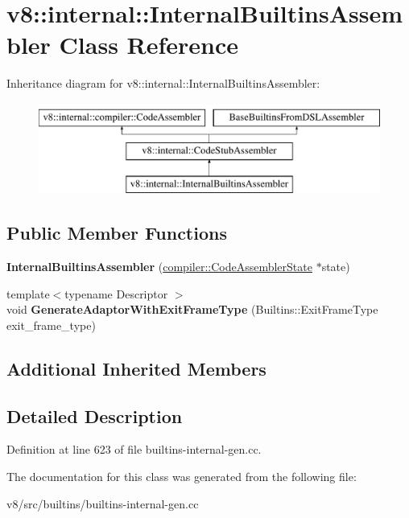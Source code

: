 \hypertarget{classv8_1_1internal_1_1InternalBuiltinsAssembler}{}\section{v8\+:\+:internal\+:\+:Internal\+Builtins\+Assembler Class Reference}
\label{classv8_1_1internal_1_1InternalBuiltinsAssembler}
Inheritance diagram for v8\+:\+:internal\+:\+:Internal\+Builtins\+Assembler\+:\begin{figure}[H]
\begin{center}
\leavevmode
\includegraphics[height=3.000000cm]{classv8_1_1internal_1_1InternalBuiltinsAssembler}
\end{center}
\end{figure}
\subsection*{Public Member Functions}
\begin{DoxyCompactItemize}
\item 
\mbox{\label{classv8_1_1internal_1_1InternalBuiltinsAssembler_a44792f3751df13c671384992a852888e}} 
{\bfseries Internal\+Builtins\+Assembler} (\mbox{\hyperlink{classv8_1_1internal_1_1compiler_1_1CodeAssemblerState}{compiler\+::\+Code\+Assembler\+State}} $\ast$state)
\item 
\mbox{\label{classv8_1_1internal_1_1InternalBuiltinsAssembler_a7cd0d3f8e7bc710cf3cdefb9d083514c}} 
{\footnotesize template$<$typename Descriptor $>$ }\\void {\bfseries Generate\+Adaptor\+With\+Exit\+Frame\+Type} (Builtins\+::\+Exit\+Frame\+Type exit\+\_\+frame\+\_\+type)
\end{DoxyCompactItemize}
\subsection*{Additional Inherited Members}


\subsection{Detailed Description}


Definition at line 623 of file builtins-\/internal-\/gen.\+cc.



The documentation for this class was generated from the following file\+:\begin{DoxyCompactItemize}
\item 
v8/src/builtins/builtins-\/internal-\/gen.\+cc\end{DoxyCompactItemize}

